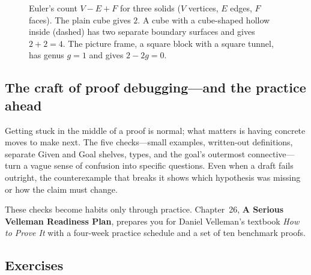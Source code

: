 \begin{figure}[htbp]
\caption{Euler's count $V - E + F$ for three solids ($V$ vertices, $E$ edges, $F$ faces). The plain cube gives $2$. A cube with a cube-shaped hollow inside (dashed) has two separate boundary surfaces and gives $2 + 2 = 4$. The picture frame, a square block with a square tunnel, has genus $g = 1$ and gives $2 - 2g = 0$.}
\label{fig:euler-polyhedra}
\end{figure}

\subsection{The craft of proof debugging---and the practice ahead}

Getting stuck in the middle of a proof is normal; what matters is having concrete moves to make next. The five checks---small examples, written-out definitions, separate Given and Goal shelves, types, and the goal's outermost connective---turn a vague sense of confusion into specific questions. Even when a draft fails outright, the counterexample that breaks it shows which hypothesis was missing or how the claim must change.

These checks become habits only through practice. Chapter~26, \textbf{A Serious Velleman Readiness Plan}, prepares you for Daniel Velleman's textbook \emph{How to Prove It} with a four-week practice schedule and a set of ten benchmark proofs.

\subsection{Exercises}

